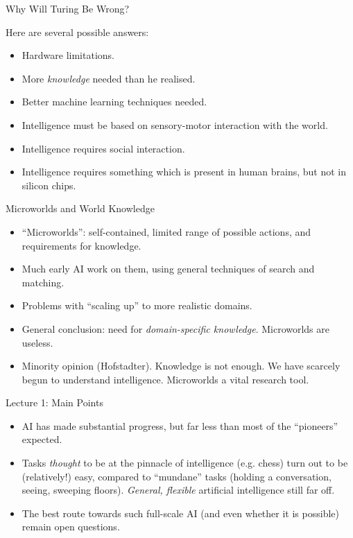 \documentclass{article}
\begin{document}
\begin{slide}{}
{\Large Why Will Turing Be Wrong?}

Here are several possible answers:
\begin{itemize}
\item Hardware limitations.
\item More {\em knowledge} needed than he realised.
\item Better machine learning techniques needed.
\item Intelligence must be based on sensory-motor
interaction with the world.
\item Intelligence requires social interaction.
\item Intelligence requires something which is present in human
brains, but not in silicon chips.
\end{itemize}
\end{slide}

\begin{slide}{}
{\Large Microworlds and World Knowledge}
\begin{itemize}
\item ``Microworlds'': self-contained, limited range of
possible actions, and requirements for knowledge.
\item Much early AI work on them, using general
techniques of search and matching.
\item Problems with ``scaling up'' to more realistic domains.
\item General conclusion: need for {\em
domain-specific knowledge}. Microworlds are useless.
\item Minority opinion (Hofstadter). Knowledge is not
enough. We have scarcely begun to understand intelligence.
Microworlds a vital research tool.
\end{itemize}
\end{slide}

\begin{slide}{}
{\Large Lecture 1: Main Points}
\begin{itemize}
\item AI has made substantial progress, but far less than most of the
``pioneers'' expected.
\item Tasks {\em thought} to be at the pinnacle of intelligence
(e.g. chess) turn out to be (relatively!) easy, compared to
``mundane'' tasks (holding a conversation, seeing, sweeping
floors). {\em General, flexible} artificial intelligence still far off.
\item The best route towards such full-scale AI (and even whether it
is possible) remain open questions.
\end{itemize}
\end{slide}
\end{document}
